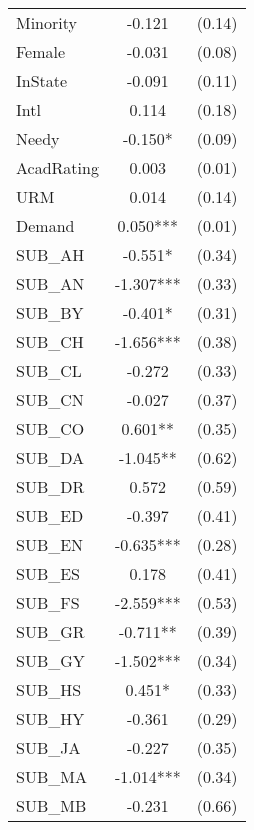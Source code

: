\begin{table}[H]
\begin{threeparttable}
\begin{tabular}{l c c}
      Minority         & -0.121    & (0.14)       \\
      Female           & -0.031    & (0.08)       \\
      InState               & -0.091    & (0.11)       \\
      Intl             & 0.114     & (0.18)       \\
      Needy            & -0.150*   & (0.09)       \\
      AcadRating       & 0.003     & (0.01)       \\
      URM              & 0.014     & (0.14)       \\
      Demand           & 0.050***  & (0.01)       \\
      SUB\_AH          & -0.551*   & (0.34)       \\
      SUB\_AN          & -1.307*** & (0.33)       \\
      SUB\_BY          & -0.401*   & (0.31)       \\
      SUB\_CH          & -1.656*** & (0.38)       \\
      SUB\_CL          & -0.272    & (0.33)       \\
      SUB\_CN          & -0.027    & (0.37)       \\
      SUB\_CO          & 0.601**   & (0.35)       \\
      SUB\_DA          & -1.045**  & (0.62)       \\
      SUB\_DR          & 0.572     & (0.59)       \\
      SUB\_ED          & -0.397    & (0.41)       \\
      SUB\_EN          & -0.635*** & (0.28)       \\
      SUB\_ES          & 0.178     & (0.41)       \\
      SUB\_FS          & -2.559*** & (0.53)       \\
      SUB\_GR          & -0.711**  & (0.39)       \\
      SUB\_GY          & -1.502*** & (0.34)       \\
      SUB\_HS          & 0.451*    & (0.33)       \\
      SUB\_HY          & -0.361    & (0.29)       \\
      SUB\_JA          & -0.227    & (0.35)       \\
      SUB\_MA          & -1.014*** & (0.34)       \\
      SUB\_MB          & -0.231    & (0.66)       \\

\end{tabular}
\end{threeparttable}
\end{table}
